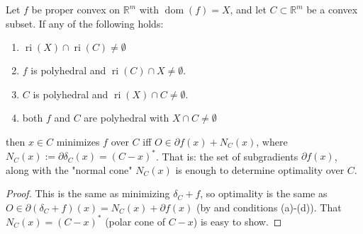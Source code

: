 \begin{prop}\label{prop:046-subgrad-optimality-conditions}
	Let $f$ be proper convex on $\mathbb{R}^m$ with $\operatorname{dom}(f)=X$, and let $C\subset \mathbb{R}^m$ be a convex subset. If any of the following holds:
	\begin{enumerate}[label=(\alph*)]
		\item $\operatorname{ri}(X)\cap \operatorname{ri}(C)\neq\emptyset$
		\item $f$ is polyhedral and $\operatorname{ri}(C)\cap X\neq\emptyset$.
		\item $C$ is polyhedral and $\operatorname{ri}(X)\cap C\neq\emptyset$.
		\item both $f$ and $C$ are polyhedral with $X\cap C\neq\emptyset$
	\end{enumerate}
	then $x\in C$ minimizes $f$ over $C$ iff $O\in\partial f(x)+N_C(x)$, where $N_C(x):=\partial \delta_C(x)=(C-x)^\ast$. That is: the set of subgradients $\partial f(x)$, along with the "normal cone" $N_C(x)$ is enough to determine optimality over $C$.
\end{prop}
\begin{proof}
	This is the same as minimizing $\delta_C+f$, so optimality is the same as $O\in\partial(\delta_C+f)(x)=N_C(x)+\partial f(x)$ (by  and conditions (a)-(d)). That $N_C(x)=(C-x)^\ast$ (polar cone of $C-x$) is easy to show.
\end{proof}
